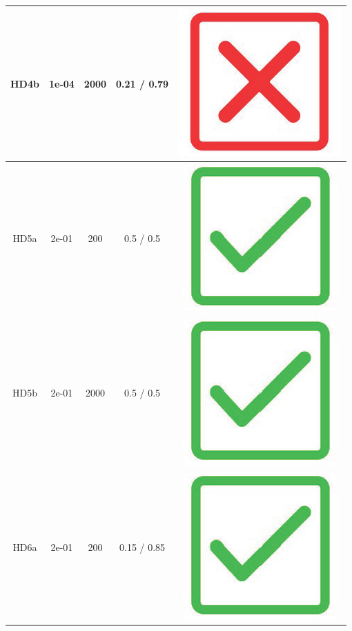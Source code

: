 \begin{table}[!h]
{\begin{tabular}[t]{ccccc}
\midrule
HD4b & 1e-04 & 2000 & 0.21 / 0.79 & \includegraphics[scale=0.05]{figs/red_cross.png}\\
\midrule
HD5a & 2e-01 & 200 & 0.5 / 0.5 & \includegraphics[scale=0.05]{figs/green_tick.png}\\
\midrule
HD5b & 2e-01 & 2000 & 0.5 / 0.5 & \includegraphics[scale=0.05]{figs/green_tick.png}\\
\midrule
\addlinespace
HD6a & 2e-01 & 200 & 0.15 / 0.85 & \includegraphics[scale=0.05]{figs/green_tick.png}\\

\end{tabular}}
\end{table}
